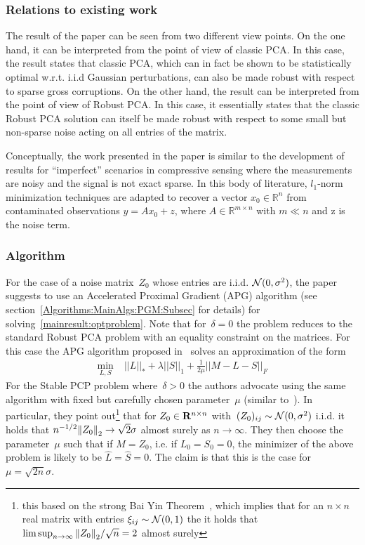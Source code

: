 \subsubsection{Relations to existing work}

The result of the paper can be seen from two different view points. On the one hand, it can be interpreted from the point of view of classic PCA. In this case, the result states that classic PCA, which can in fact be shown to be statistically optimal w.r.t. i.i.d Gaussian perturbations, can also be made robust with respect to sparse gross corruptions. On the other hand, the result can be interpreted from the point of view of Robust PCA. In this case, it essentially states that the classic Robust PCA solution can itself be made robust with respect to some small but non-sparse noise acting on all entries of the matrix.

Conceptually, the work presented in the paper is similar to the development of results for ``imperfect'' scenarios in compressive sensing where the measurements are noisy and the signal is not exact sparse. In this body of literature, $l_1$-norm minimization techniques are adapted to recover a vector $x_0 \in \mathbb{R}^n$ from contaminated observations $y=Ax_0+z$, where $A \in \mathbb{R}^{m\times n}$ with $m \ll n$ and z is the noise term.


\subsubsection{Algorithm}

For the case of a noise matrix~$Z_0$ whose entries are i.i.d. ${\mathcal{N}}(0,\sigma^2)$, the paper suggests to use an Accelerated Proximal Gradient (APG) algorithm (see section~\ref{Algorithms:MainAlgs:PGM:Subsec} for details) for solving~\eqref{mainresult:optproblem}. Note that for~$\delta =0$ the problem reduces to the standard Robust PCA problem with an equality constraint on the matrices. For this case the APG algorithm proposed in~\cite{Lin:2009kx} solves an approximation of the form
\begin{align*}
\min_{L,S} \; &||L||_* + \lambda ||S||_1 + \frac{1}{2\mu} ||M-L-S||_F
\end{align*}
For the Stable PCP problem where~$\delta>0$ the authors advocate using the same algorithm with fixed but carefully chosen parameter~$\mu$ (similar to~\cite{Candes:2010fk}). In particular, they point out\footnote{this based on the strong Bai Yin Theorem~\cite{Bai:1988fk}, which implies that for an $n\times n$ real matrix with entries $\xi_{ij} \sim {\mathcal{N}}(0,1)$ the it holds that $\limsup_{n\rightarrow \infty} {\left\|Z_0\right\|}_{2}^{}/\sqrt{n} = 2$ almost surely}
 that for $Z_0 \in{\mathbf R}^{n\times n}$ with~$(Z_0)_{ij} \sim {\mathcal{N}}(0,\sigma^2)$ i.i.d. it holds that $n^{-1/2}{\left\|Z_0\right\|}_{2}^{} \rightarrow \sqrt{2}\sigma$ almost surely as $n\rightarrow\infty$. They then choose the parameter~$\mu$ such that if $M=Z_0$, i.e. if $L_0=S_0=0$, the minimizer of the above problem is likely to be $\hat{L}=\hat{S}=0$. The claim is that this is the case for~$\mu = \sqrt{2n}\sigma$.

